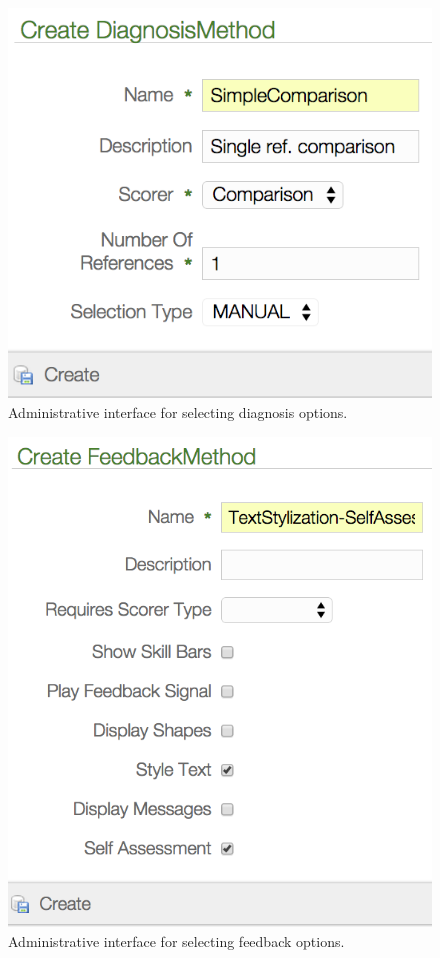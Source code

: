 \documentclass[11pt,a4paper,onecolumn]{article}
\begin{document}

	\begin{figure}
	\centering
	\includegraphics[width=.7\textwidth]{../../colloquium/createDM} 
	\caption{Administrative interface for selecting diagnosis options.}
	\label{fig:createDM}
	\end{figure}



	\begin{figure}
	\centering
	\includegraphics[width=.7\textwidth]{../../colloquium/createFM} 
	\caption{Administrative interface for selecting feedback options.}
	\label{fig:createFM}
	\end{figure}

\clearpage
\printbibliography[title={References}]
\end{document}
